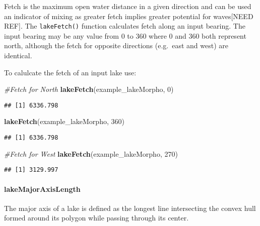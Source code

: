 \documentclass[11pt,]{article}
\newenvironment{Shaded}{\begin{snugshade}}{\end{snugshade}}
\newcommand{\KeywordTok}[1]{\textcolor[rgb]{0.13,0.29,0.53}{\textbf{{#1}}}}
\newcommand{\DecValTok}[1]{\textcolor[rgb]{0.00,0.00,0.81}{{#1}}}
\newcommand{\CommentTok}[1]{\textcolor[rgb]{0.56,0.35,0.01}{\textit{{#1}}}}
\newcommand{\NormalTok}[1]{{#1}}
\begin{document}
Fetch is the maximum open water distance in a given direction and can be
used an indicator of mixing as greater fetch implies greater potential
for waves{[}NEED REF{]}. The \texttt{lakeFetch()} function calculates
fetch along an input bearing. The input bearing may be any value from 0
to 360 where 0 and 360 both represent north, although the fetch for
opposite directions (e.g.~east and west) are identical.

To calulcate the fetch of an input lake use:

\begin{Shaded}
\begin{Highlighting}[]
\CommentTok{#Fetch for North}
\KeywordTok{lakeFetch}\NormalTok{(example_lakeMorpho, }\DecValTok{0}\NormalTok{)}
\end{Highlighting}
\end{Shaded}

\begin{verbatim}
## [1] 6336.798
\end{verbatim}

\begin{Shaded}
\begin{Highlighting}[]
\KeywordTok{lakeFetch}\NormalTok{(example_lakeMorpho, }\DecValTok{360}\NormalTok{)}
\end{Highlighting}
\end{Shaded}

\begin{verbatim}
## [1] 6336.798
\end{verbatim}

\begin{Shaded}
\begin{Highlighting}[]
\CommentTok{#Fetch for West}
\KeywordTok{lakeFetch}\NormalTok{(example_lakeMorpho, }\DecValTok{270}\NormalTok{)}
\end{Highlighting}
\end{Shaded}

\begin{verbatim}
## [1] 3129.997
\end{verbatim}

\paragraph{lakeMajorAxisLength}\label{lakemajoraxislength}

The major axis of a lake is defined as the longest line intersecting the
convex hull formed around its polygon while passing through its center.
\end{document}
